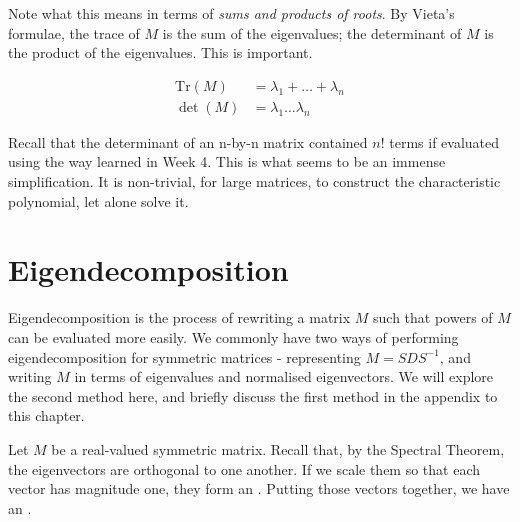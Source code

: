 \documentclass[a4paper, 12pt,oneside,openany]{book}
\begin{document}


Note what this means in terms of \emph{sums and products of roots}. By Vieta's formulae, the trace of $M$ is the sum of the eigenvalues; the determinant of $M$ is the product of the eigenvalues. This is important.

\begin{align*} \text{Tr}(M) &= \lambda_1+\dots+\lambda_n \\ \det(M) &= \lambda_1\dots\lambda_n \end{align*}

Recall that the determinant of an n-by-n matrix contained $n!$ terms if evaluated using the way learned in Week 4. This is what seems to be an immense simplification. It is non-trivial, for large matrices, to construct the characteristic polynomial, let alone solve it.

\section{Eigendecomposition}

Eigendecomposition is the process of rewriting a matrix $M$ such that powers of $M$ can be evaluated more easily. We commonly have two ways of performing eigendecomposition for symmetric matrices - representing $M=SDS^{-1}$, and writing $M$ in terms of eigenvalues and normalised eigenvectors. We will explore the second method here, and briefly discuss the first method in the appendix to this chapter.

Let $M$ be a real-valued symmetric matrix. Recall that, by the Spectral Theorem, the eigenvectors are orthogonal to one another. If we scale them so that each vector has magnitude one, they form an . Putting those vectors together, we have an .
\end{document}
